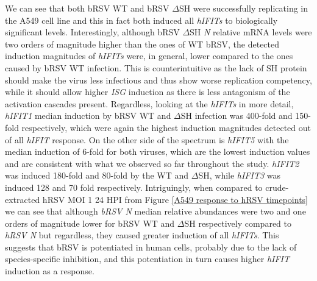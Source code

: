 We can see that both bRSV WT and bRSV \(\Delta\)SH were successfully replicating in the A549 cell line and this in fact both induced all \textit{hIFITs} to biologically significant levels. Interestingly, although bRSV \(\Delta\)SH \textit{N} relative mRNA levels were two orders of magnitude higher than the ones of WT bRSV, the detected induction magnitudes of \textit{hIFITs} were, in general, lower compared to the ones caused by bRSV WT infection. This is counterintuitive as the lack of SH protein should make the virus less infectious and thus show worse replication competency, while it should allow higher \textit{ISG} induction as there is less antagonism of the activation cascades present. Regardless, looking at the \textit{hIFITs} in more detail, \textit{hIFIT1} median induction by bRSV WT and \(\Delta\)SH infection was 400-fold and 150-fold respectively, which were again the highest induction magnitudes detected out of all \textit{hIFIT} response. On the other side of the spectrum is \textit{hIFIT5} with the median induction of 6-fold for both viruses, which are the lowest induction values and are consistent with what we observed so far throughout the study. \textit{hIFIT2} was induced 180-fold and 80-fold by the WT and \(\Delta\)SH, while \textit{hIFIT3} was induced 128 and 70 fold respectively. Intriguingly, when compared to crude-extracted hRSV MOI 1 24 HPI from Figure \ref{A549 response to hRSV timepoints} we can see that although \textit{bRSV N} median relative abundances were two and one orders of magnitude lower for bRSV WT and \(\Delta\)SH respectively compared to \textit{hRSV N} but regardless, they caused greater induction of all \textit{hIFITs}. This suggests that bRSV is potentiated in human cells, probably due to the lack of species-specific inhibition, and this potentiation in turn causes higher \textit{hIFIT} induction as a response.

